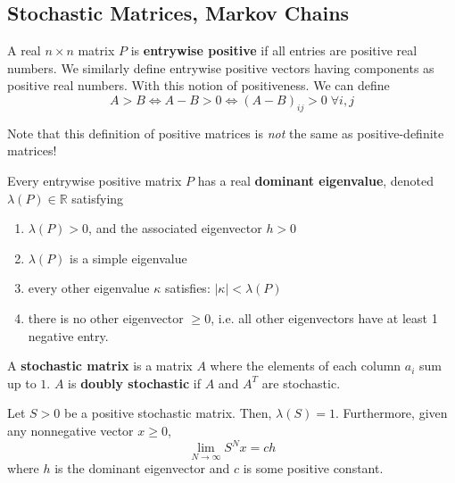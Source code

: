 \subsection{Stochastic Matrices, Markov Chains}

  \begin{definition}
    A real $n \times n$ matrix $P$ is \textbf{entrywise positive} if all entries are positive real numbers. We similarly define entrywise positive vectors having components as positive real numbers. With this notion of positiveness. We can define
    \begin{equation}
      A > B \iff A - B > 0 \iff (A-B)_{i j} > 0 \; \forall i, j
    \end{equation}
  \end{definition}

  Note that this definition of positive matrices is \textit{not} the same as positive-definite matrices! 

  \begin{theorem}
    Every entrywise positive matrix $P$ has a real \textbf{dominant eigenvalue}, denoted $\lambda(P) \in \mathbb{R}$ satisfying
    \begin{enumerate}
      \item $\lambda(P) > 0$, and the associated eigenvector $h >0$
      \item $\lambda(P)$ is a simple eigenvalue
      \item every other eigenvalue $\kappa$ satisfies: $|\kappa| < \lambda(P)$
      \item there is no other eigenvector $\geq 0$, i.e. all other eigenvectors have at least 1 negative entry.
    \end{enumerate}
  \end{theorem}

  \begin{definition}
    A \textbf{stochastic matrix} is a matrix $A$ where the elements of each column $a_i$ sum up to $1$. $A$ is \textbf{doubly stochastic} if $A$ and $A^T$ are stochastic. 
  \end{definition}

  \begin{theorem}
    Let $S > 0$ be a positive stochastic matrix. Then, $\lambda(S) = 1$. Furthermore, given any nonnegative vector $x \geq 0$, 
    \begin{equation}
      \lim_{N \rightarrow \infty} S^N x = c h
    \end{equation}
    where $h$ is the dominant eigenvector and $c$ is some positive constant. 
  \end{theorem}

